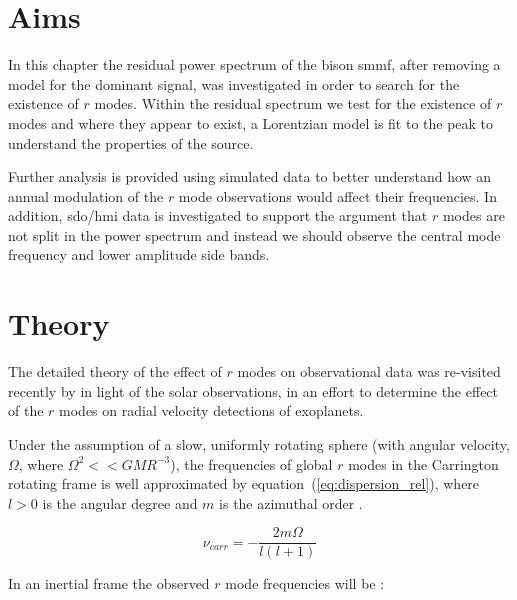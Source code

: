 \section{Aims}\label{sec:r-mode_aims}

In this chapter the residual power spectrum of the \gls{bison} \gls{smmf}, after removing a model for the dominant signal, was investigated in order to search for the existence of $r$ modes. Within the residual spectrum we test for the existence of $r$ modes and where they appear to exist, a Lorentzian model is fit to the peak to understand the properties of the source.

Further analysis is provided using simulated data to better understand how an annual modulation of the $r$ mode observations would affect their frequencies. In addition, \gls{sdo/hmi} data is investigated to support the argument that $r$ modes are not split in the power spectrum and instead we should observe the central mode frequency and lower amplitude side bands.



\section{Theory}\label{sec:r-mode_theory}

The detailed theory of the effect of $r$ modes on observational data was re-visited recently by \citet{lanza_sectoral_2019} in light of the solar observations, in an effort to determine the effect of the $r$ modes on radial velocity detections of exoplanets.

Under the assumption of a slow, uniformly rotating sphere (with angular velocity, $\Omega$, where $\Omega^2 << GMR^{-3}$), the frequencies of global $r$ modes in the Carrington rotating frame is well approximated by equation~(\ref{eq:dispersion_rel}), where $l > 0$ is the angular degree and $m$ is the azimuthal order \citep{loptien_global-scale_2018, lanza_sectoral_2019}.

\begin{equation}
\nu_{carr} = - \frac{2m\Omega}{l(l + 1)}
\label{eq:dispersion_rel}
\end{equation}

In an inertial frame the observed $r$ mode frequencies will be \citep{lanza_sectoral_2019}:


